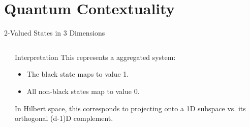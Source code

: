 \documentclass{beamer}
\begin{document}
\section{Quantum Contextuality}
\begin{frame}{2-Valued States in 3 Dimensions}
    \begin{columns}[c] %
        \begin{column}{0.45\textwidth}
        \end{column}
        \begin{column}{0.55\textwidth}
            \begin{block}{Interpretation}
            This represents a aggregated system:
            \begin{itemize}
                \item The \alert{black} state maps to value 1.
                \item All \alert{non-black} states map to value 0.
            \end{itemize}
            In Hilbert space, this corresponds to projecting onto a 1D subspace vs. its orthogonal (d-1)D complement.
            \end{block}
        \end{column}
    \end{columns}
\end{frame}
\end{document}
